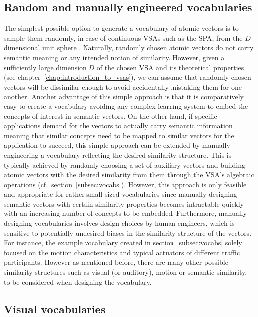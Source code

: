 \subsection{Random and manually engineered vocabularies}%
\label{subsec:basic_random_vocabularies}

The simplest possible option to generate a vocabulary of atomic vectors is to sample them randomly, in case of continuous \acp{VSA} such as the \ac{SPA}, from the $D$-dimensional unit sphere \parencite{Voelker2017}.
Naturally, randomly chosen atomic vectors do not carry semantic meaning or any intended notion of similarity.
However, given a sufficiently large dimension $D$ of the chosen \ac{VSA} and its theoretical properties (see chapter~\ref{chap:introduction_to_vsas}), we can assume that randomly chosen vectors will be dissimilar enough to avoid accidentally mistaking them for one another.
Another advantage of this simple approach is that it is comparatively easy to create a vocabulary avoiding any complex learning system to embed the concepts of interest in semantic vectors.
On the other hand, if specific applications demand for the vectors to actually carry semantic information meaning that similar concepts need to be mapped to similar vectors for the application to succeed, this simple approach can be extended by manually engineering a vocabulary reflecting the desired similarity structure.
This is typically achieved by randomly choosing a set of auxiliary vectors and building atomic vectors with the desired similarity from them through the \ac{VSA}'s algebraic operations (cf.\ section~\ref{subsec:vocabs}).
However, this approach is only feasible and appropriate for rather small sized vocabularies since manually designing semantic vectors with certain similarity properties becomes intractable quickly with an increasing number of concepts to be embedded.
Furthermore, manually designing vocabularies involves design choices by human engineers, which is sensitive to potentially undesired biases in the similarity structure of the vectors.
For instance, the example vocabulary created in section~\ref{subsec:vocabs} solely focused on the motion characteristics and typical actuators of different traffic participants.
However as mentioned before, there are many other possible similarity structures such as visual (or auditory), motion or semantic similarity, to be considered when designing the vocabulary.

\subsection{Visual vocabularies}%
\label{subsec:visual_vocabularies}

